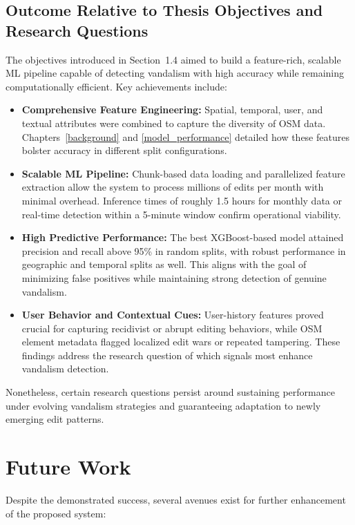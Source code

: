 \documentclass[
    13pt, %
    a4paper, %
    DIV14, %
    listof=totoc, %
    bibliography=totoc, %
    index=totoc, %
    headsepline
]{scrreprt}
\begin{document}
\subsection{Outcome Relative to Thesis Objectives and Research Questions}
The objectives introduced in Section~1.4 aimed to build a feature-rich, scalable ML pipeline capable of detecting vandalism with high accuracy while remaining computationally efficient. Key achievements include:
\begin{itemize}
    \item \textbf{Comprehensive Feature Engineering:} Spatial, temporal, user, and textual attributes were combined to capture the diversity of OSM data. Chapters~\ref{background} and \ref{model_performance} detailed how these features bolster accuracy in different split configurations.
    \item \textbf{Scalable ML Pipeline:} Chunk-based data loading and parallelized feature extraction allow the system to process millions of edits per month with minimal overhead. Inference times of roughly 1.5 hours for monthly data or real-time detection within a 5-minute window confirm operational viability.
    \item \textbf{High Predictive Performance:} The best XGBoost-based model attained precision and recall above 95\% in random splits, with robust performance in geographic and temporal splits as well. This aligns with the goal of minimizing false positives while maintaining strong detection of genuine vandalism.
    \item \textbf{User Behavior and Contextual Cues:} User-history features proved crucial for capturing recidivist or abrupt editing behaviors, while OSM element metadata flagged localized edit wars or repeated tampering. These findings address the research question of which signals most enhance vandalism detection.
\end{itemize}
Nonetheless, certain research questions persist around sustaining performance under evolving vandalism strategies and guaranteeing adaptation to newly emerging edit patterns.

\section{Future Work}
\label{sec:future_work}

Despite the demonstrated success, several avenues exist for further enhancement of the proposed system:
\end{document}

